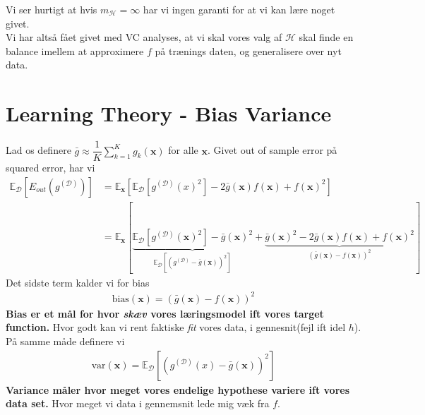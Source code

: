 \documentclass[paper=a4, fontsize=11pt]{scrartcl} %
\numberwithin{equation}{section} %
\numberwithin{figure}{section} %
\numberwithin{table}{section} %
\begin{document}
	Vi ser hurtigt at hvis $m_\mathcal{H}=\infty$ har vi ingen garanti for at vi kan lære noget givet. \\
	
	Vi har altså fået givet med VC analyses, at vi skal vores valg af $\mathcal{H}$ skal finde en balance imellem at approximere $f$ på trænings daten, og generalisere over nyt data.
	
	\newpage
	
	\section*{Learning Theory - Bias Variance}
	
	Lad os definere $\bar{g}\approx\dfrac{1}{K}\sum_{k=1}^{K}g_k(\mathbf{x})$ for alle $\mathbf{x}$. Givet out of sample error på squared error, har vi
	\begin{align*}
	\mathbb{E}_\mathcal{D}[E_{out}(g^{(\mathcal{D})})] &= \mathbb{E}_\mathbf{x}[\mathbb{E}_\mathcal{D}[g^{(\mathcal{D})}(x)^2]-2\bar{g}(\mathbf{x})f(\mathbf{x})+f(\mathbf{x})^2] \\
	&=\mathbb{E}_\mathbf{x}[\underbrace{\mathbb{E}_\mathcal{D}[g^{(\mathcal{D})}(\mathbf{x})^2]-\bar{g}(\mathbf{x})^2}_{\mathbb{E}_\mathcal{D}[(g^{(\mathcal{D})}-\bar{g}(\mathbf{x}))^2]} + \underbrace{\bar{g}(\mathbf{x})^2-2\bar{g}(\mathbf{x})f(\mathbf{x})+f(\mathbf{x})^2}_{(\bar{g}(\mathbf{x})-f(\mathbf{x}))^2}]  
	\end{align*}
	Det sidste term kalder vi for bias
	\begin{align*}
	\text{bias}(\mathbf{x})=(\bar{g}(\mathbf{x})-f(\mathbf{x}))^2
	\end{align*}
	\textbf{Bias er et mål for hvor \textit{skæv} vores læringsmodel ift vores target function.} Hvor godt kan vi rent faktiske \textit{fit} vores data, i gennesnit(fejl ift idel $h$). På samme måde definere vi
	\begin{align*}
	\text{var}(\mathbf{x})=\mathbb{E}_\mathcal{D}[(g^{(\mathcal{D})}(x)-\bar{g}(\mathbf{x}))^2]
	\end{align*}
	\textbf{Variance måler hvor meget vores endelige hypothese variere ift vores data set.} Hvor meget vi data i gennemsnit lede mig væk fra $f$. \\
	
\end{document}
